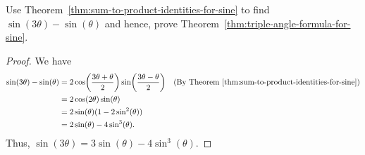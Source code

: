 \question[4]
Use Theorem~\ref{thm:sum-to-product-identities-for-sine} to find $\sin(3\theta) - \sin(\theta)$ and hence, prove Theorem~\ref{thm:triple-angle-formula-for-sine}.

\begin{EnvFullwidth}
\begin{solutionorgrid}[4.5in]
\begin{proof}
We have
\begin{align*}
	\sin(3\theta) - \sin(\theta) &= 2\cos\! \left( \frac{3\theta + \theta}{2} \right) \sin\! \left( \frac{3\theta - \theta}{2} \right) && (\textrm{By Theorem~\ref{thm:sum-to-product-identities-for-sine}}) \\
	&= 2\cos(2\theta)\sin(\theta) \\
	&= 2\sin(\theta)(1 - 2\sin^2(\theta)) \\
	&= 2\sin(\theta) - 4\sin^3(\theta).
\end{align*}
Thus, $\sin(3\theta) = 3\sin(\theta) - 4\sin^3(\theta)$.
\end{proof}
\end{solutionorgrid}
\end{EnvFullwidth}
